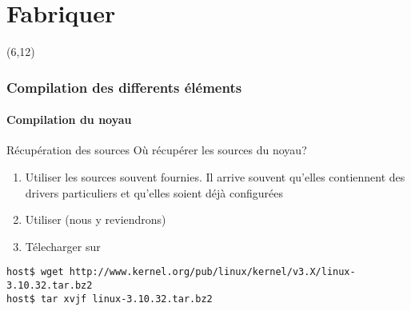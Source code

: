 %
%

\part{Fabriquer}

{
\begin{frame}[plain]
  \partpage
  \begin{textblock}{10}(6,12)
    \begin{quote}
      \rmfamily\textit\textbf\color{darkgray}{\large
        ``Talk is cheap. Show me the code.''}
        \vskip3mm\hspace*{}
    \end{quote}
  \end{textblock}
\end{frame}
}

\begin{frame}
  \tableofcontents
\end{frame}

\section{Compilation des differents éléments}

\subsection{Compilation du noyau}

\begin{frame}[fragile=singleslide]{Récupération des sources}
  Où récupérer les sources du noyau?
  \begin{enumerate}
  \item Utiliser  les sources souvent fournies.  Il arrive souvent
    qu'elles  contiennent  des  drivers particuliers  et  qu'elles
    soient déjà configurées
  \item Utiliser  (nous y reviendrons)
  \item Télecharger sur 
  \end{enumerate}
  \begin{lstlisting}
host$ wget http://www.kernel.org/pub/linux/kernel/v3.X/linux-3.10.32.tar.bz2
host$ tar xvjf linux-3.10.32.tar.bz2
  \end{lstlisting}
\end{frame}

